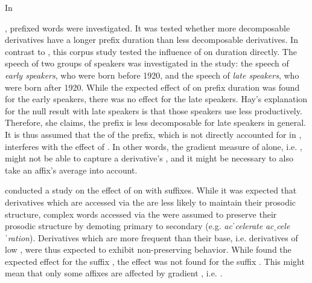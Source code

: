 {In {\citet{Hay.2007},  prefixed words were investigated. It was tested whether more decomposable derivatives have a longer prefix duration than less decomposable  derivatives.  In contrast to \cite{Hay.2003}, this corpus study tested the influence of  on duration directly. The speech of two groups of speakers was investigated in the study: the speech of \textit{early speakers}, who were born before 1920, and the speech of \textit{late speakers}, who were born after 1920. 
While the expected effect of  on prefix duration was found for the early speakers, there was no effect  for the late speakers. Hay's explanation for the null result with late speakers is that those speakers use  less productively. Therefore, she claims, the prefix is less decomposable for late speakers in general. It is thus assumed that the  of the prefix, which is not directly accounted for in , interferes with the effect of . In other words, the gradient measure of  alone, i.e. , might not be able to capture a derivative's , and it might be necessary to also take an affix's average  into account.
 
 \cite{Collie.2008} conducted a study on the effect of  on  with suffixes. While it was expected that derivatives which are accessed via the  are less likely to maintain their prosodic structure, complex words accessed via the  were assumed to preserve their prosodic structure by demoting primary  to secondary  (e.g. \textit{acˈcelerate} \textendash  \textit{acˌceleˈration}). Derivatives which are more frequent than their base, i.e. derivatives of low , were thus expected to exhibit non-preserving behavior. While \cite{Collie.2008} found the expected effect for the suffix , the effect was not found for the suffix . This might mean that only some affixes are affected by gradient , i.e. .
 	
}}
